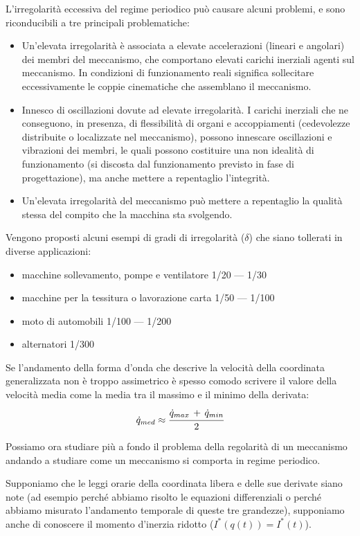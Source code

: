 L'irregolarità eccessiva del regime periodico può causare alcuni problemi, e sono riconducibili a tre principali problematiche:
\begin{itemize}
\item Un'elevata irregolarità è associata a elevate accelerazioni (lineari e angolari) dei membri del meccanismo, che comportano elevati carichi inerziali agenti sul meccanismo. In condizioni di funzionamento reali significa sollecitare eccessivamente le coppie cinematiche che assemblano il meccanismo.
\item Innesco di oscillazioni dovute ad elevate irregolarità. I carichi inerziali che ne conseguono, in presenza, di flessibilità di organi e accoppiamenti (cedevolezze distribuite o localizzate nel meccanismo), possono innescare oscillazioni e vibrazioni dei membri, le quali possono costituire una non idealità di funzionamento (si discosta dal funzionamento previsto in fase di progettazione), ma anche mettere a repentaglio l'integrità.
\item Un'elevata irregolarità del meccanismo può mettere a repentaglio la qualità stessa del compito che la macchina sta svolgendo.
\end{itemize}

Vengono proposti alcuni esempi di gradi di irregolarità ($\delta$) che siano tollerati in diverse applicazioni:

\begin{itemize}
\item macchine sollevamento, pompe e ventilatore \hfill 1/20 --- 1/30
\item macchine per la tessitura o lavorazione carta \hfill 1/50 --- 1/100
\item moto di automobili \hfill 1/100 --- 1/200
\item alternatori \hfill 1/300
\end{itemize}

Se l'andamento della forma d'onda che descrive la velocità della coordinata generalizzata non è troppo assimetrico è spesso comodo scrivere il valore della velocità media come la media tra il massimo e il minimo della derivata:
\[\dot{q}_{med} \approx \cfrac{\dot{q}_{max}\,+\,\dot{q}_{min}}{2}\]

Possiamo ora studiare più a fondo il problema della regolarità di un meccanismo andando a studiare come un meccanismo si comporta in regime periodico.

Supponiamo che le leggi orarie della coordinata libera e delle sue derivate siano note (ad esempio perché abbiamo risolto le equazioni differenziali o perché abbiamo misurato l'andamento temporale di queste tre grandezze), supponiamo anche di conoscere il momento d'inerzia ridotto ($I^*(q(t)) = I^*(t)$).


